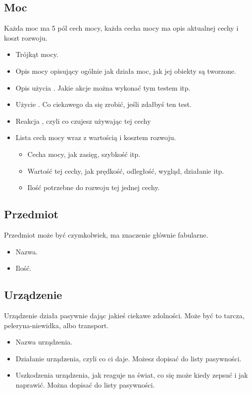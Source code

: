 \subsection{Moc}
Każda moc ma 5 pól cech mocy, każda cecha mocy ma opis aktualnej cechy i koszt rozwoju.
\begin{itemize} 
\item Trójkąt mocy.
\item Opis mocy opisujący ogólnie jak działa moc, jak jej obiekty są tworzone.
\item Opis użycia \absm. Jakie akcje można wykonać tym testem itp.
\item Użycie \abdm. Co ciekawego da się zrobić, jeśli zdałbyś ten test.
\item Reakcja \abrm, czyli co czujesz używając tej cechy
\item Lista cech mocy wraz z wartością i kosztem rozwoju.
\begin{itemize}
 \item Cecha mocy, jak zasięg, szybkość itp.
 \item Wartość tej cechy, jak prędkość, odległość, wygląd, działanie itp.
 \item Ilość \xpmcn potrzebne do rozwoju tej jednej cechy.
\end{itemize}
\end{itemize}

\subsection{Przedmiot}
Przedmiot może być czymkolwiek, ma znaczenie głównie fabularne.
\begin{itemize}
 \item Nazwa.
 \item Ilość.
\end{itemize}

\subsection{Urządzenie}
Urządzenie działa pasywnie dając jakieś ciekawe zdolności.
Może być to tarcza, peleryna-niewidka, albo transport.
\begin{itemize}
\item Nazwa urządzenia.
\item Działanie urządzenia, czyli co ci daje. Możesz dopisać do listy pasywności.
\item Uszkodzenia urządzenia, jak reaguje na świat, co się może kiedy zepsuć i jak naprawić. Można dopisać do listy pasywności.
\end{itemize}

